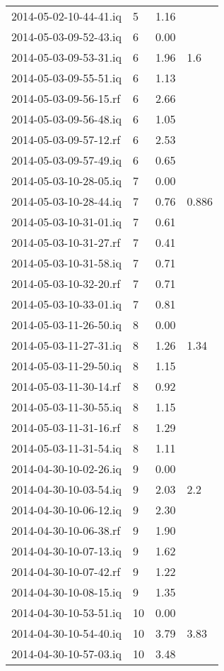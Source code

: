 \begin{center}
\begin{longtable}{@{}l p{1cm} p{3cm} p{3cm} @{}}
		2014-05-02-10-44-41.iq & 5 & 1.16 &  \\ 
		2014-05-03-09-52-43.iq & 6 & 0.00 &  \\ 
		2014-05-03-09-53-31.iq & 6 & 1.96 & 1.6 \\ 
		2014-05-03-09-55-51.iq & 6 & 1.13 &  \\ 
		2014-05-03-09-56-15.rf & 6 & 2.66 &  \\ 
		2014-05-03-09-56-48.iq & 6 & 1.05 &  \\ 
		2014-05-03-09-57-12.rf & 6 & 2.53 &  \\ 
		2014-05-03-09-57-49.iq & 6 & 0.65 &  \\ 
		2014-05-03-10-28-05.iq & 7 & 0.00 &  \\ 
		2014-05-03-10-28-44.iq & 7 & 0.76 & 0.886 \\ 
		2014-05-03-10-31-01.iq & 7 & 0.61 &  \\ 
		2014-05-03-10-31-27.rf & 7 & 0.41 &  \\ 
		2014-05-03-10-31-58.iq & 7 & 0.71 &  \\ 
		2014-05-03-10-32-20.rf & 7 & 0.71 &  \\ 
		2014-05-03-10-33-01.iq & 7 & 0.81 &  \\ 
		2014-05-03-11-26-50.iq & 8 & 0.00 &  \\ 
		2014-05-03-11-27-31.iq & 8 & 1.26 & 1.34 \\ 
		2014-05-03-11-29-50.iq & 8 & 1.15 &  \\ 
		2014-05-03-11-30-14.rf & 8 & 0.92 &  \\ 
		2014-05-03-11-30-55.iq & 8 & 1.15 &  \\ 
		2014-05-03-11-31-16.rf & 8 & 1.29 &  \\ 
		2014-05-03-11-31-54.iq & 8 & 1.11 &  \\ 
		2014-04-30-10-02-26.iq & 9 & 0.00 &  \\ 
		2014-04-30-10-03-54.iq & 9 & 2.03 & 2.2 \\ 
		2014-04-30-10-06-12.iq & 9 & 2.30 &  \\ 
		2014-04-30-10-06-38.rf & 9 & 1.90 &  \\ 
		2014-04-30-10-07-13.iq & 9 & 1.62 &  \\ 
		2014-04-30-10-07-42.rf & 9 & 1.22 &  \\ 
		2014-04-30-10-08-15.iq & 9 & 1.35 &  \\ 
		2014-04-30-10-53-51.iq & 10 & 0.00 &  \\ 
		2014-04-30-10-54-40.iq & 10 & 3.79 & 3.83 \\ 
		2014-04-30-10-57-03.iq & 10 & 3.48 &  \\ 

\end{longtable}
\end{center}
